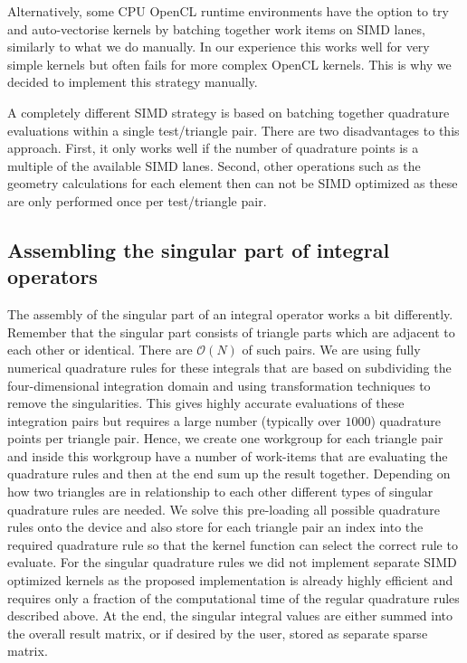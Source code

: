 Alternatively, some CPU OpenCL runtime environments have the option to try and auto-vectorise kernels by batching together work items on SIMD lanes, similarly to what we do manually. In our experience this works well for very simple kernels but often fails for more complex OpenCL kernels. This is why we decided to implement this strategy manually.

A completely different SIMD strategy is based on batching together quadrature evaluations within a single test/triangle pair. There are two disadvantages to this approach. First, it only works well if the number of quadrature points is a multiple of the available SIMD lanes. Second, other operations such as the geometry calculations for each element then can not be SIMD optimized as these are only performed once per test/triangle pair.


\subsection{Assembling the singular part of integral operators}

The assembly of the singular part of an integral operator works a bit differently. Remember that the singular part consists of triangle parts which are adjacent to each other or identical. There are $\mathcal{O}(N)$ of such pairs. We are using fully numerical quadrature rules for these integrals that are based on subdividing the four-dimensional integration domain and using transformation techniques to remove the singularities. This gives highly accurate evaluations of these integration pairs but requires a large number (typically over $1000$) quadrature points per triangle pair. Hence, we create one workgroup for each triangle pair and inside this workgroup have a number of work-items that are evaluating the quadrature rules and then at the end sum up the result together. Depending on how two triangles are in relationship to each other different types of singular quadrature rules are needed. We solve this pre-loading all possible quadrature rules onto the device and also store for each triangle pair an index into the required quadrature rule so that the kernel function can select the correct rule to evaluate. For the singular quadrature rules we did not implement separate SIMD optimized kernels as the proposed implementation is already highly efficient and requires only a fraction of the computational time of the regular quadrature rules described above. At the end, the singular integral values are either summed into the overall result matrix, or if desired by the user, stored as separate sparse matrix.

